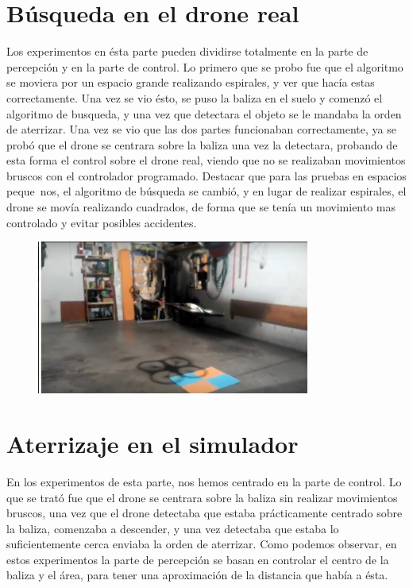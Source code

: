 \section{B\'usqueda en el drone real}
\hspace{1cm} Los experimentos en \'esta parte pueden dividirse totalmente en la parte de percepci\'on y en la parte de control. Lo primero que se probo fue que el algoritmo se moviera por un espacio grande realizando espirales, y ver que hac\'ia estas correctamente. Una vez se vio \'esto, se puso la baliza en el suelo y comenz\'o el algoritmo de busqueda, y una vez que detectara el objeto se le mandaba la orden de aterrizar. Una vez se vio que las dos partes funcionaban correctamente, ya se prob\'o que el drone se centrara sobre la baliza una vez la detectara, probando de esta forma el control sobre el drone real, viendo que no se realizaban movimientos bruscos con el controlador programado. Destacar que para las pruebas en espacios peque~nos, el algoritmo de b\'usqueda se cambi\'o, y en lugar de realizar espirales, el drone se mov\'ia realizando cuadrados, de forma que se ten\'ia un movimiento mas controlado y evitar posibles accidentes. 
\begin{figure}[H]
	\centering
		\includegraphics[width=0.8\textwidth]{imgs/search_real.jpg}
	\label{fig:Despegue sobre la baliza del coche.}
\end{figure}

\section{Aterrizaje en el simulador}
\hspace{1cm} En los experimentos de esta parte, nos hemos centrado en la parte de control. Lo que se trat\'o fue que el drone se centrara sobre la baliza sin realizar movimientos bruscos, una vez que el drone detectaba que estaba pr\'acticamente centrado sobre la baliza, comenzaba a descender, y una vez detectaba que estaba lo suficientemente cerca enviaba la orden de aterrizar. Como podemos observar, en estos experimentos la parte de percepci\'on se basan en controlar el centro de la baliza y el \'area, para tener una aproximaci\'on de la distancia que hab\'ia a \'esta. 


